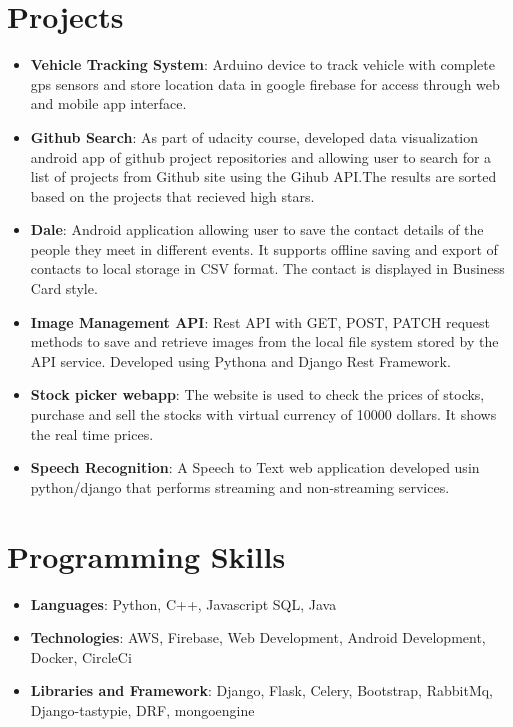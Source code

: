 \documentclass[letterpaper,11pt]{article}
\newcommand{\resumeItem}[2]{
  \item\small{
    \textbf{#1}{: #2 \vspace{-2pt}}
  }
}
\newcommand{\resumeSubItem}[2]{\resumeItem{#1}{#2}\vspace{-4pt}}
\newcommand{\resumeSubHeadingListStart}{\begin{itemize}[leftmargin=*]}
\newcommand{\resumeSubHeadingListEnd}{\end{itemize}}
\begin{document}
\section{Projects}
  \resumeSubHeadingListStart
    \resumeSubItem{Vehicle Tracking System}
      {Arduino device to track vehicle with complete gps sensors and store location data in google firebase for access through web and mobile app interface.}
    \resumeSubItem{Github Search}
      {As part of udacity course, developed data visualization android app of github project repositories and allowing user to search for a list of projects from Github site using the Gihub API.The results are sorted based on the projects that recieved high stars.}
    \resumeSubItem{Dale}
      {Android application allowing user to save the contact details of the people they meet in different events. It supports offline saving and export of contacts to local storage in CSV format. The contact is displayed in Business Card style.}
    \resumeSubItem{Image Management API}
      {Rest API with GET, POST, PATCH request methods to save and retrieve images from the local file system stored by the API service. Developed using Pythona and Django Rest Framework.}
    \resumeSubItem{Stock picker webapp}
      {The website is used to check the prices of stocks, purchase and sell the stocks with virtual currency of 10000 dollars. It shows the real time prices.}
    \resumeSubItem{Speech Recognition}
      {A Speech to Text web application developed usin python/django that  performs streaming and non-streaming services.}
  \resumeSubHeadingListEnd


\section{Programming Skills}
  \resumeSubHeadingListStart
    \item{
      \textbf{Languages}{: Python, C++, Javascript SQL, Java}
     }
    \item{
      \textbf{Technologies}{: AWS, Firebase, Web Development, Android Development, Docker, CircleCi}
    }
    \item{
      \textbf{Libraries and Framework}{: Django, Flask, Celery, 
      Bootstrap, RabbitMq, Django-tastypie, DRF, mongoengine}
    }
  \resumeSubHeadingListEnd



\end{document}
